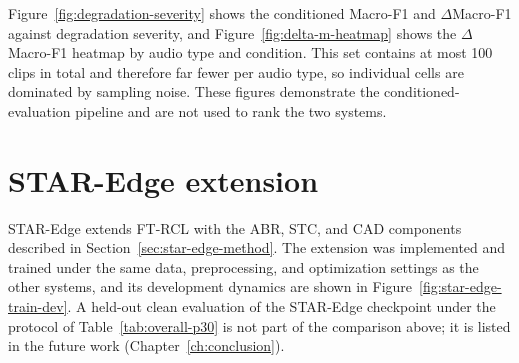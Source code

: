 
Figure~\ref{fig:degradation-severity} shows the conditioned Macro-F1 and $\Delta$Macro-F1 against degradation severity, and Figure~\ref{fig:delta-m-heatmap} shows the $\Delta$Macro-F1 heatmap by audio type and condition. This set contains at most 100 clips in total and therefore far fewer per audio type, so individual cells are dominated by sampling noise. These figures demonstrate the conditioned-evaluation pipeline and are not used to rank the two systems.



\section{STAR-Edge extension}
\label{sec:star-edge}

STAR-Edge extends FT-RCL with the ABR, STC, and CAD components described in Section~\ref{sec:star-edge-method}. The extension was implemented and trained under the same data, preprocessing, and optimization settings as the other systems, and its development dynamics are shown in Figure~\ref{fig:star-edge-train-dev}. A held-out clean evaluation of the STAR-Edge checkpoint under the protocol of Table~\ref{tab:overall-p30} is not part of the comparison above; it is listed in the future work (Chapter~\ref{ch:conclusion}).


